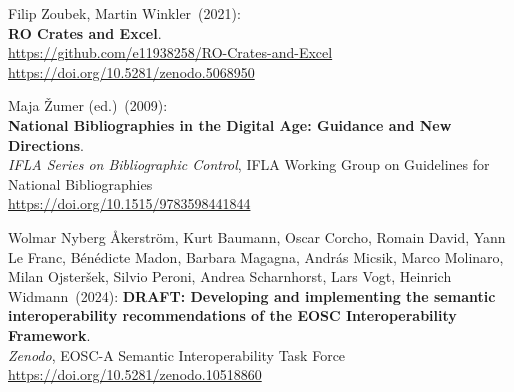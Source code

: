 \begin{thebibliography}{9}
Filip Zoubek, Martin Winkler~(2021): \\
\textbf{RO Crates and Excel}.\\
\url{https://github.com/e11938258/RO-Crates-and-Excel}\\
\url{https://doi.org/10.5281/zenodo.5068950}

Maja Žumer (ed.)~(2009): \\
\textbf{National Bibliographies in the Digital Age: Guidance and New Directions}.\\
\emph{IFLA Series on Bibliographic Control}, IFLA Working Group on
Guidelines for National Bibliographies\\
\url{https://doi.org/10.1515/9783598441844}

Wolmar Nyberg Åkerström, Kurt Baumann, Oscar Corcho, Romain David, Yann Le Franc, Bénédicte Madon, Barbara Magagna, András Micsik, Marco Molinaro, Milan Ojsteršek, Silvio Peroni, Andrea Scharnhorst, Lars Vogt, Heinrich Widmann~(2024):  
\textbf{DRAFT: Developing and implementing the semantic interoperability recommendations of the EOSC Interoperability Framework}.\\
\emph{Zenodo}, EOSC-A Semantic Interoperability Task Force \\
\url{https://doi.org/10.5281/zenodo.10518860}

\end{thebibliography}

\makeatother

